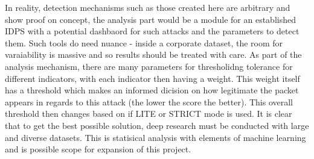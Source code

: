 
In reality, detection mechanisms such as those created here are arbitrary and show proof on concept, the analysis part would be a module for an established IDPS with a potential dashbaord for such attacks and the parameters to detect them. Such tools do need nuance - inside a corporate dataset, the room for varaiability is massive and so results should be treated with care. As part of the analysis mechanism, there are many parameters for thresholidng tolerance for different indicators,
with each indicator then having a weight. This weight itself has a threshold which makes an informed dicision on how legitimate the packet appears in regards to this attack (the lower the score the better). This overall threshold then changes based on if LITE or STRICT mode is used. It is clear that to get the best possible solution, deep research must be conducted with large and diverse datasets. This is statisical analysis with elements of machine learning and is possible scope for expansion of this project. 




